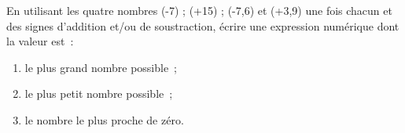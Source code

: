 \documentclass[exercice]{thedocument}%
\begin{document}
%
En utilisant les quatre nombres (-7) ; (+15) ; (-7,6) et (+3,9) une fois
chacun et des signes d'addition et/ou de soustraction, écrire une
expression numérique dont la valeur est~:
\begin{enumerate}
    \item le plus grand nombre possible~;\vskip50pt
    \item le plus petit nombre possible~;\vskip50pt
    \item le nombre le plus proche de zéro.\vskip50pt
\end{enumerate}
\end{document}
